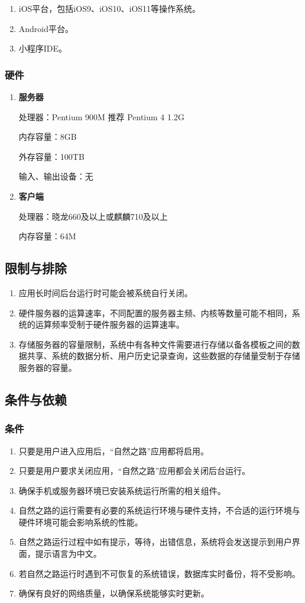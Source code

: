 \begin{enumerate}
\item iOS平台，包括iOS9、iOS10、iOS11等操作系统。
\item Android平台。
\item 小程序IDE。
\end{enumerate}

\subsubsection{硬件}
\begin{enumerate}
\item \textbf{服务器}

处理器：Pentium 900M 推荐 Pentium 4 1.2G

内存容量：8GB

外存容量：100TB

输入、输出设备：无

\item \textbf{客户端}

处理器：晓龙660及以上或麒麟710及以上

内存容量：64M
\end{enumerate}

\subsection{限制与排除}
\begin{enumerate}
\item 应用长时间后台运行时可能会被系统自行关闭。
\item 硬件服务器的运算速率，不同配置的服务器主频、内核等数量可能不相同，系统的运算频率受制于硬件服务器的运算速率。
\item 存储服务器的容量限制，系统中有各种文件需要进行存储以备各模板之间的数据共享、系统的数据分析、用户历史记录查询，这些数据的存储量受制于存储服务器的容量。
\end{enumerate}

\subsection{条件与依赖}
\subsubsection{条件}
\begin{enumerate}
\item 只要是用户进入应用后，“自然之路”应用都将启用。
\item 只要是用户要求关闭应用，“自然之路”应用都会关闭后台运行。
\item 确保手机或服务器环境已安装系统运行所需的相关组件。
\item 自然之路的运行需要有必要的系统运行环境与硬件支持，不合适的运行环境与硬件环境可能会影响系统的性能。
\item 自然之路运行过程中如有提示，等待，出错信息，系统将会发送提示到用户界面，提示语言为中文。
\item 若自然之路运行时遇到不可恢复的系统错误，数据库实时备份，将不受影响。
\item 确保有良好的网络质量，以确保系统能够实时更新。
\end{enumerate}

